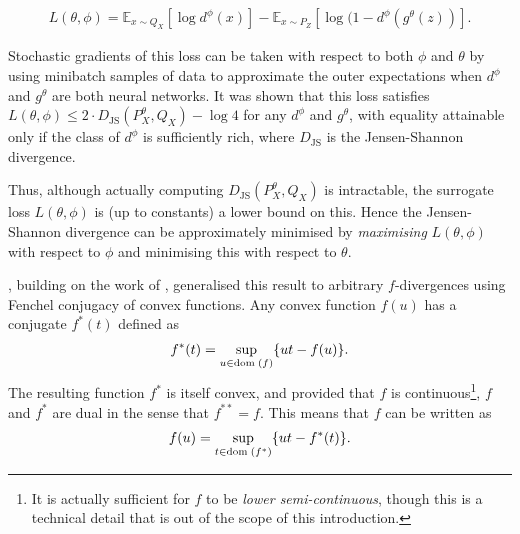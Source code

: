 \begin{align*}
L(\theta, \phi) = \mathbb{E}_{x\sim Q_X}\left[ \log d^\phi(x) \right] - \mathbb{E}_{x \sim P_Z} \left[\log(1 - d^\phi(g^\theta(z)) \right].
\end{align*}

Stochastic gradients of this loss can be taken with respect to both $\phi$ and $\theta$ by using minibatch samples of data to approximate the outer expectations when $d^\phi$ and $g^\theta$ are both neural networks.
It was shown that this loss satisfies $L(\theta, \phi) \leq 2 \cdot D_{\text{JS}}(P^\theta_X, Q_X) - \log 4$ for any $d^\phi$ and $g^\theta$, with equality attainable only if the class of $d^\phi$ is sufficiently rich, where $D_{\text{JS}}$ is the Jensen-Shannon divergence. 

Thus, although actually computing $D_{\text{JS}}(P^\theta_X, Q_X)$ is intractable, the surrogate loss $L(\theta, \phi)$ is (up to constants) a lower bound on this.
Hence the Jensen-Shannon divergence can be approximately minimised by \emph{maximising} $L(\theta, \phi)$ with respect to $\phi$ and minimising this with respect to $\theta$.

\cite{f-gan}, building on the work of \cite{nguyen}, generalised this result to arbitrary $f$-divergences using Fenchel conjugacy of convex functions.
Any convex function $f(u)$ has a conjugate $f^*(t)$ defined as 
%
\begin{align*}
f^*(t) = \sup_{u \in {\bf{\rm dom}}\;(f)} \{ut - f(u)\}.
\end{align*}
%
The resulting function $f^*$ is itself convex, and
provided that $f$ is continuous\footnote{It is actually sufficient for $f$ to be \emph{lower semi-continuous}, though this is a technical detail that is out of the scope of this introduction.}, $f$ and $f^*$ are dual in the sense that $f^{**} = f$.
This means that $f$ can be written as
%
\begin{align*}
f(u) = \sup_{t \in {\bf{\rm dom}}\;(f^*)} \{ut - f^*(t)\}.
\end{align*}

